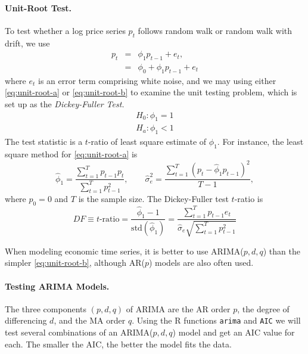 \paragraph{Unit-Root Test.} To test whether a log price series $p_t$ follows random walk or random walk with drift, we use
\begin{subequations}
	\begin{eqnarray}
	p_t &=& \phi_1 p_{t-1} + e_t, \label{eq:unit-root-a} \\
	 &=& \phi_0 + \phi_1 p_{t-1} + e_t \label{eq:unit-root-b}
	\end{eqnarray}
\end{subequations}
where $e_t$ is an error term comprising white noise, and we may using either \eqref{eq:unit-root-a} or \eqref{eq:unit-root-b} to examine the unit testing problem, which is set up as the \emph{Dickey-Fuller Test.}\\
\begin{eqnarray*}
H_0: \phi_1 = 1 \\
H_a: \phi_1 < 1
\end{eqnarray*}
The test statistic is a $t$-ratio of least square estimate of $\phi_1$. For instance, the least square method for \eqref{eq:unit-root-a} is
\[
\hat{\phi}_1 = \frac{\sum^T_{t=1}p_{t-1}p_t}{\sum^T_{t=1}p^2_{t-1}}, \qquad
\hat{\sigma}^2_e = \frac{\sum^T_{t=1}(p_t-\hat{\phi}_1 p_{t-1})^2}{T-1},
\]
where $p_0=0$ and $T$ is the sample size. The Dickey-Fuller test $t$-ratio is
\[
DF \equiv \text{$t$-ratio} = \frac{\hat{\phi}_1-1}{\text{std}(\hat{\phi}_1)} 
= \frac{\sum^T_{t=1}p_{t-1}e_t}{\hat{\sigma}_e \sqrt{\sum^T_{t=1}p^2_{t-1}}}
\]

When modeling economic time series, it is better to use ARIMA($p,d,q$) than the simpler \eqref{eq:unit-root-b}, although AR($p$) models are also often used.

\paragraph{Testing ARIMA Models.} The three components $(p, d, q)$ of ARIMA are the AR order $p$, the degree of differencing $d$, and the MA order $q$. Using the R functions \texttt{arima} and \texttt{AIC} we will test several combinations of an ARIMA($p,d,q$) model and get an AIC value for each. The smaller the AIC, the better the model fits the data.


